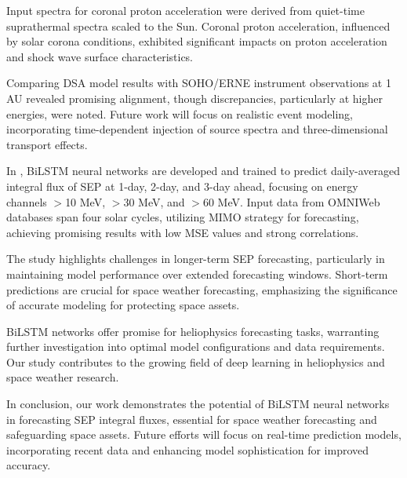 Input spectra for coronal proton acceleration were derived from quiet-time suprathermal spectra scaled to the Sun. Coronal proton acceleration, influenced by solar corona conditions, exhibited significant impacts on proton acceleration and shock wave surface characteristics.

Comparing DSA model results with SOHO/ERNE instrument observations at 1 AU revealed promising alignment, though discrepancies, particularly at higher energies, were noted. Future work will focus on realistic event modeling, incorporating time-dependent injection of source spectra and three-dimensional transport effects.

In \citet{mnedal_2023a}, BiLSTM neural networks are developed and trained to predict daily-averaged integral flux of SEP at 1-day, 2-day, and 3-day ahead, focusing on energy channels $>$10 MeV, $>$30 MeV, and $>$60 MeV. Input data from OMNIWeb databases span four solar cycles, utilizing MIMO strategy for forecasting, achieving promising results with low MSE values and strong correlations.

The study highlights challenges in longer-term SEP forecasting, particularly in maintaining model performance over extended forecasting windows. Short-term predictions are crucial for space weather forecasting, emphasizing the significance of accurate modeling for protecting space assets.

BiLSTM networks offer promise for heliophysics forecasting tasks, warranting further investigation into optimal model configurations and data requirements. Our study contributes to the growing field of deep learning in heliophysics and space weather research.

In conclusion, our work demonstrates the potential of BiLSTM neural networks in forecasting SEP integral fluxes, essential for space weather forecasting and safeguarding space assets. Future efforts will focus on real-time prediction models, incorporating recent data and enhancing model sophistication for improved accuracy.
